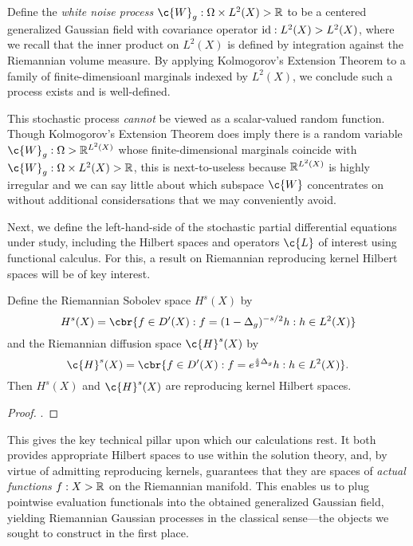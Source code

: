\documentclass[11pt]{book}
\begin{document}
\begin{definition}
Define the \emph{white noise process} $\c{W}_g : \Omega \x L^2(X) \-> \R$ to be a centered generalized Gaussian field with covariance operator $\operatorname{id} : L^2(X) \-> L^2(X)$, where we recall that the inner product on $L^2(X)$ is defined by integration against the Riemannian volume measure.
By applying Kolmogorov's Extension Theorem to a family of finite-dimensioanl marginals indexed by $L^2(X)$, we conclude such a process exists and is well-defined.
\end{definition}

This stochastic process \emph{cannot} be viewed as a scalar-valued random function.
Though Kolmogorov's Extension Theorem does imply there is a random variable $\c{W}_g : \Omega \-> \R^{L^2(X)}$ whose finite-dimensional marginals coincide with $\c{W}_g : \Omega \x L^2(X) \-> \R$, this is next-to-useless because $\mathbb{R}^{L^2(X)}$ is highly irregular and we can say little about which subspace $\c{W}$ concentrates on without additional considersations that we may conveniently avoid.

Next, we define the left-hand-side of the stochastic partial differential equations under study, including the Hilbert spaces and operators $\c{L}$ of interest using functional calculus.
For this, a result on Riemannian reproducing kernel Hilbert spaces will be of key interest.

\begin{result}
Define the Riemannian Sobolev space $H^s(X)$ by
\[
H^s(X) = \cbr{f \in D'(X) : f = (1 - \lap_g)^{-s/2} h : h \in L^2(X)}
\]
and the Riemannian diffusion space $\c{H}^s(X)$ by
\[
\c{H}^s(X) = \cbr{f \in D'(X) : f = e^{\frac{s}{2}\lap_g} h : h \in L^2(X)}
.
\]
Then $H^s(X)$ and $\c{H}^s(X)$ are reproducing kernel Hilbert spaces.
\end{result}

\begin{proof}
\textcite[Theorem 3 and Theorem 6]{devito20}.
\end{proof}

This gives the key technical pillar upon which our calculations rest.
It both provides appropriate Hilbert spaces to use within the solution theory, and, by virtue of admitting reproducing kernels, guarantees that they are spaces of \emph{actual functions} $f : X \-> \mathbb{R}$ on the Riemannian manifold.
This enables us to plug pointwise evaluation functionals into the obtained generalized Gaussian field, yielding Riemannian Gaussian processes in the classical sense---the objects we sought to construct in the first place.
\end{document}
